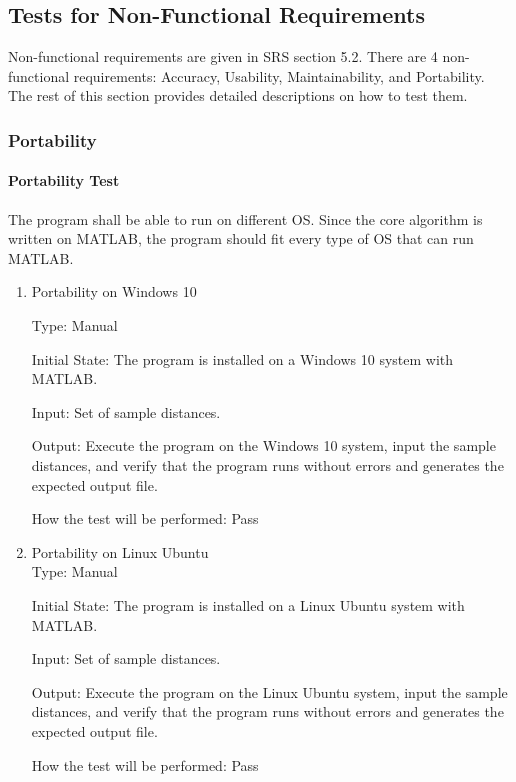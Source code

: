 \documentclass[12pt, titlepage]{article}
\begin{document}
\subsection{Tests for Non-Functional Requirements}
\label{tnfr}

Non-functional requirements are given in SRS section 5.2. There are 4 non-functional requirements: Accuracy, Usability, Maintainability, and Portability. The 
rest of this section provides detailed descriptions on how to test them.

\subsubsection{Portability}\label{Aport}

\paragraph{Portability Test} The program shall be able to run on different OS. Since the core algorithm is written on MATLAB, the program should fit every type of OS that can run MATLAB.\textsuperscript{\cite{rosellon2003different}}

\begin{enumerate}

\item{Portability on Windows 10\\}

Type: Manual
					
Initial State: The program is installed on a Windows 10 system with MATLAB.
					
Input: Set of sample distances.
					
Output: Execute the program on the Windows 10 system, input the sample distances, and verify that the program runs without errors and generates the expected output file.
					
How the test will be performed: Pass


\item{Portability on Linux Ubuntu}\\

Type: Manual
					
Initial State: The program is installed on a Linux Ubuntu system with MATLAB.
					
Input: Set of sample distances.
					
Output:  Execute the program on the Linux Ubuntu system, input the sample distances, and verify that the program runs without errors and generates the expected output file. 
					
How the test will be performed: Pass

\end{enumerate}
\end{document}
